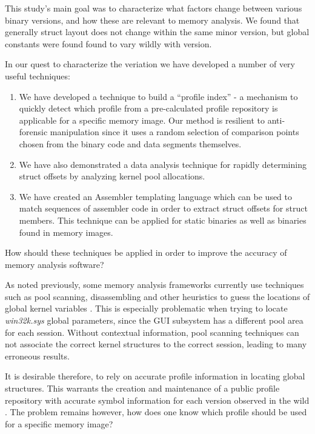 This study's main goal was to characterize what factors change between various
binary versions, and how these are relevant to memory analysis. We found that
generally struct layout does not change within the same minor version, but
global constants were found found to vary wildly with version.


In our quest to characterize the veriation we have developed a number of very
useful techniques:

\begin{enumerate}
\item We have developed a technique to build a ``profile index'' - a mechanism
  to quickly detect which profile from a pre-calculated profile repository is
  applicable for a specific memory image. Our method is resilient to
  anti-forensic manipulation since it uses a random selection of comparison
  points chosen from the binary code and data segments themselves.

\item We have also demonstrated a data analysis technique for rapidly
  determining struct offsets by analyzing kernel pool allocations.

\item We have created an Assembler templating language which can be used to
  match sequences of assembler code in order to extract struct offsets for
  struct members. This technique can be applied for static binaries as well as
  binaries found in memory images.
\end{enumerate}

How should these techniques be applied in order to improve the accuracy of
memory analysis software?

As noted previously, some memory analysis frameworks currently use techniques
such as pool scanning, disassembling and other heuristics to guess the locations
of global kernel variables \cite{volatility}. This is especially problematic
when trying to locate {\em win32k.sys} global parameters, since the GUI
subsystem has a different pool area for each session. Without contextual
information, pool scanning techniques can not associate the correct kernel
structures to the correct session, leading to many erroneous results.

It is desirable therefore, to rely on accurate profile information in locating
global structures. This warrants the creation and maintenance of a public
profile repository with accurate symbol information for each version observed in
the wild \citep{rekall-profiles}. The problem remains however, how does one know
which profile should be used for a specific memory image?

